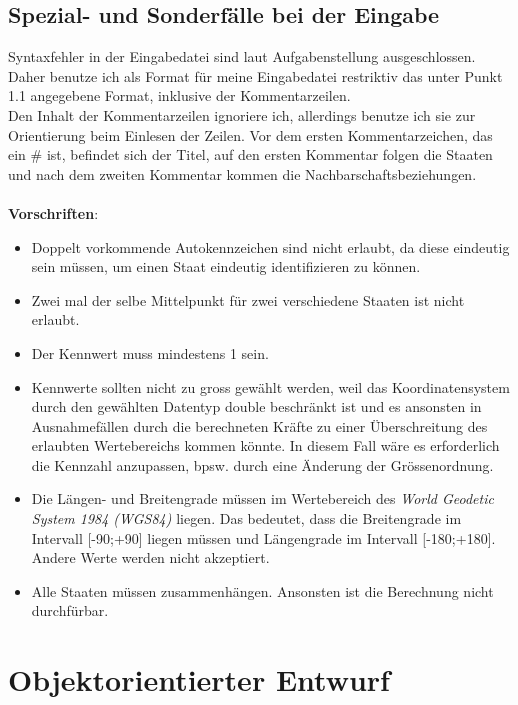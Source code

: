 \documentclass[a4paper,11pt]{article}
\begin{document}
{\subsection{Spezial- und Sonderf\"alle bei der Eingabe}
Syntaxfehler in der Eingabedatei sind laut Aufgabenstellung ausgeschlossen. Daher benutze ich als Format f\"ur meine Eingabedatei restriktiv das unter Punkt 1.1 angegebene Format,
inklusive der Kommentarzeilen.\\ Den Inhalt der Kommentarzeilen ignoriere ich, allerdings benutze ich sie zur Orientierung beim Einlesen der Zeilen. Vor dem ersten Kommentarzeichen, das ein \# ist, befindet sich
der Titel, auf den ersten Kommentar folgen die Staaten und nach dem zweiten Kommentar kommen die Nachbarschaftsbeziehungen.\\ \\ \textbf{Vorschriften}:\\
\vspace{3mm}
\begin{itemize}
\item Doppelt vorkommende Autokennzeichen sind nicht erlaubt, da diese eindeutig sein m\"ussen, um einen Staat eindeutig identifizieren zu k\"onnen.\\
\item Zwei mal der selbe Mittelpunkt f\"ur zwei verschiedene Staaten ist nicht erlaubt. \\
\item Der Kennwert muss mindestens 1 sein.
\item Kennwerte sollten nicht zu gross gew\"ahlt werden, weil das Koordinatensystem durch den gew\"ahlten Datentyp
double beschr\"ankt ist und es ansonsten in Ausnahmef\"allen durch die berechneten Kr\"afte zu einer \"Uberschreitung des erlaubten Wertebereichs kommen k\"onnte. In diesem Fall w\"are es erforderlich die Kennzahl anzupassen, bpsw. durch eine \"Anderung der Gr\"ossenordnung.
\item Die L\"angen- und Breitengrade m\"ussen im Wertebereich des \textit{World Geodetic System 1984 (WGS84)} liegen. Das bedeutet, dass die Breitengrade im Intervall [-90;+90] liegen m\"ussen und L\"angengrade im Intervall [-180;+180].
Andere Werte werden nicht akzeptiert.
\item Alle Staaten m\"ussen zusammenh\"angen. Ansonsten ist die Berechnung nicht durchf\"urbar.
\end{itemize}
\section{Objektorientierter Entwurf}
}
\end{document}
